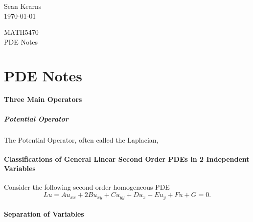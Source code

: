 \documentclass[12pt, a4paper]{article}
\theoremstyle{plain}
\theoremstyle{definition}
\theoremstyle{remark}
\begin{document}
\author{Sean Kearns}

\begin{minipage}{0.44\textwidth}
\begin{flushleft}
Sean Kearns\\
\today
\end{flushleft}
\end{minipage}
\begin{minipage}{0.44\textwidth}
\begin{flushright}
MATH5470\\
PDE Notes
\end{flushright}
\end{minipage}



\tableofcontents











\newpage
\part{PDE Notes}

\subsection{Three Main Operators}

\subsubsection{Potential Operator}
The Potential Operator, often called the Laplacian, 






\subsection{Classifications of General Linear Second Order PDEs in 2 Independent Variables}

Consider the following second order homogeneous PDE
$$ Lu = Au_{xx} + 2Bu_{xy} + Cu_{yy} + Du_x + Eu_y + Fu + G = 0.$$








\subsection{Separation of Variables}
\end{document}
